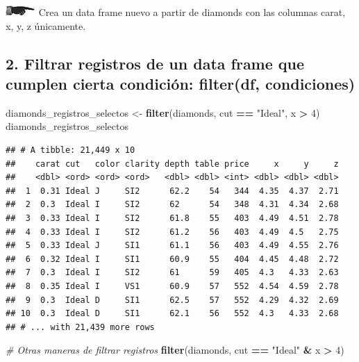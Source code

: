 \documentclass[]{book}
\newenvironment{Shaded}{\begin{snugshade}}{\end{snugshade}}
\newcommand{\KeywordTok}[1]{\textcolor[rgb]{0.13,0.29,0.53}{\textbf{#1}}}
\newcommand{\DecValTok}[1]{\textcolor[rgb]{0.00,0.00,0.81}{#1}}
\newcommand{\StringTok}[1]{\textcolor[rgb]{0.31,0.60,0.02}{#1}}
\newcommand{\CommentTok}[1]{\textcolor[rgb]{0.56,0.35,0.01}{\textit{#1}}}
\newcommand{\OperatorTok}[1]{\textcolor[rgb]{0.81,0.36,0.00}{\textbf{#1}}}
\newcommand{\NormalTok}[1]{#1}
\theoremstyle{definition}
\theoremstyle{definition}
\theoremstyle{definition}
\theoremstyle{remark}
\begin{document}
\includegraphics{./imagenes/manicule2.jpg} Crea un data frame nuevo a
partir de diamonds con las columnas carat, x, y, z únicamente.

\subsection{2. Filtrar registros de un data frame que cumplen cierta
condición: filter(df,
condiciones)}\label{filtrar-registros-de-un-data-frame-que-cumplen-cierta-condicion-filterdf-condiciones}

\begin{Shaded}
\begin{Highlighting}[]
\NormalTok{diamonds_registros_selectos <-}\StringTok{ }\KeywordTok{filter}\NormalTok{(diamonds, cut }\OperatorTok{==}\StringTok{ "Ideal"}\NormalTok{, x }\OperatorTok{>}\StringTok{ }\DecValTok{4}\NormalTok{)}
\NormalTok{diamonds_registros_selectos}
\end{Highlighting}
\end{Shaded}

\begin{verbatim}
## # A tibble: 21,449 x 10
##    carat cut   color clarity depth table price     x     y     z
##    <dbl> <ord> <ord> <ord>   <dbl> <dbl> <int> <dbl> <dbl> <dbl>
##  1  0.31 Ideal J     SI2      62.2    54   344  4.35  4.37  2.71
##  2  0.3  Ideal I     SI2      62      54   348  4.31  4.34  2.68
##  3  0.33 Ideal I     SI2      61.8    55   403  4.49  4.51  2.78
##  4  0.33 Ideal I     SI2      61.2    56   403  4.49  4.5   2.75
##  5  0.33 Ideal J     SI1      61.1    56   403  4.49  4.55  2.76
##  6  0.32 Ideal I     SI1      60.9    55   404  4.45  4.48  2.72
##  7  0.3  Ideal I     SI2      61      59   405  4.3   4.33  2.63
##  8  0.35 Ideal I     VS1      60.9    57   552  4.54  4.59  2.78
##  9  0.3  Ideal D     SI1      62.5    57   552  4.29  4.32  2.69
## 10  0.3  Ideal D     SI1      62.1    56   552  4.3   4.33  2.68
## # ... with 21,439 more rows
\end{verbatim}

\begin{Shaded}
\begin{Highlighting}[]
\CommentTok{# Otras maneras de filtrar registros}
\KeywordTok{filter}\NormalTok{(diamonds, cut }\OperatorTok{==}\StringTok{ "Ideal"} \OperatorTok{&}\StringTok{ }\NormalTok{x }\OperatorTok{>}\StringTok{ }\DecValTok{4}\NormalTok{)}
\end{Highlighting}
\end{Shaded}
\end{document}
